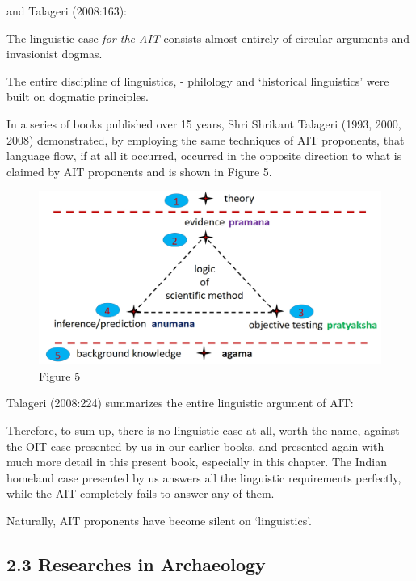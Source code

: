 and Talageri (2008:163):

\begin{myquote}
The linguistic case \textit{for the AIT} consists almost entirely of circular arguments and invasionist dogmas.
\end{myquote}

The entire discipline of linguistics, - philology and ‘historical linguistics’ were built on dogmatic principles.

In a series of books published over 15 years, Shri Shrikant Talageri (1993, 2000, 2008) demonstrated, by employing the same techniques of AIT proponents, that language flow, if at all it occurred, occurred in the opposite direction to what is claimed by AIT proponents and is shown in Figure 5.

\begin{figure}
\includegraphics{"images/8-05.jpg"}
\caption{Figure 5}
\end{figure}

Talageri (2008:224) summarizes the entire linguistic argument of AIT:

\begin{myquote}
Therefore, to sum up, there is no linguistic case at all, worth the name, against the OIT case presented by us in our earlier books, and presented again with much more detail in this present book, especially in this chapter. The Indian homeland case presented by us answers all the linguistic requirements perfectly, while the AIT completely fails to answer any of them.
\end{myquote}

Naturally, AIT proponents have become silent on ‘linguistics’.


\subsection{2.3 Researches in Archaeology}


